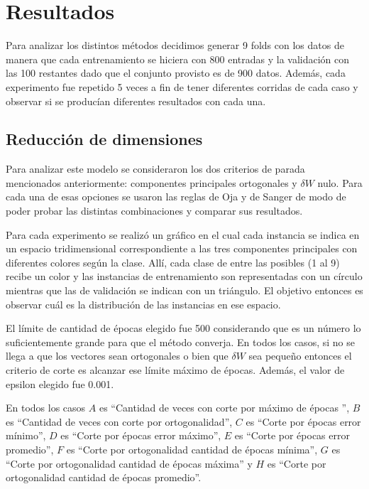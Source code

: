 \documentclass[informe.tex]{subfiles}
\begin{document}
  
  \section{Resultados}
    Para analizar los distintos métodos decidimos generar 9 folds con los datos de manera que cada entrenamiento se hiciera con 800 entradas y la validación con las 100 restantes dado que el conjunto provisto es de 900 datos. Además, cada experimento fue repetido 5 veces a fin de tener diferentes corridas de cada caso y observar si se produc\'ian diferentes resultados con cada una.
    
    \subsection{Reducción de dimensiones}
      Para analizar este modelo se consideraron los dos criterios de parada mencionados anteriormente: componentes principales ortogonales y $\delta W$ nulo. Para cada una de esas opciones se usaron las reglas de Oja y de Sanger de modo de poder probar las distintas combinaciones y comparar sus resultados. 
      
      Para cada experimento se realizó un gráfico en el cual cada instancia se indica en un espacio tridimensional correspondiente a las tres componentes principales con diferentes colores según la clase. Allí, cada clase de entre las posibles (1 al 9) recibe un color y las instancias de entrenamiento son representadas con un círculo mientras que las de validación se indican con un triángulo. El objetivo entonces es observar cuál es la distribución de las instancias en ese espacio.
      
      El l\'imite de cantidad de \'epocas elegido fue 500 considerando que es un n\'umero lo suficientemente grande para que el método converja. En todos los casos, si no se llega a que los vectores sean ortogonales o bien que $\delta W$ sea pequeño entonces el criterio de corte es alcanzar ese límite máximo de épocas. Además, el valor de epsilon elegido fue 0.001.
      
      En todos los casos $A$ es ``Cantidad de veces con corte por máximo de épocas '', $B$ es ``Cantidad de veces con corte por ortogonalidad'', $C$ es ``Corte por épocas error mínimo'', $D$ es ``Corte por épocas error máximo'', $E$ es ``Corte por épocas error promedio'', $F$ es ``Corte por ortogonalidad cantidad de épocas mínima'', $G$ es ``Corte por ortogonalidad cantidad de épocas máxima'' y $H$ es ``Corte por ortogonalidad cantidad de épocas promedio''.
      
\end{document}

